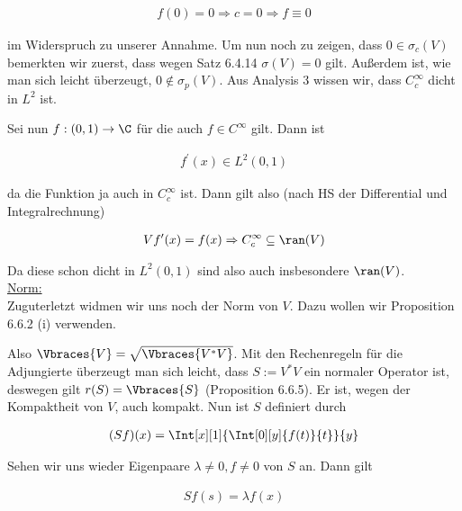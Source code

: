\begin{solution}
\begin{align*}
  f(0) = 0
  \Rightarrow
  c = 0
  \Rightarrow
  f \equiv 0
\end{align*}

im Widerspruch zu unserer Annahme. Um nun noch zu zeigen, dass $0 \in \sigma_c(V)$
bemerkten wir zuerst, dass wegen Satz 6.4.14 $\sigma(V) = {0}$ gilt. Außerdem ist,
wie man sich leicht überzeugt, $0 \notin \sigma_p(V)$. Aus Analysis 3 wissen wir, dass
$C_c^{\infty}$ dicht in $L^2$ ist.


Sei nun $f: (0,1) \rightarrow \C$ für die auch $ f \in C^{\infty}$ gilt. Dann ist

\begin{align*}
  f^\prime(x) \in L^2(0,1)
\end{align*}

da die Funktion ja auch in $C_c^{\infty}$ ist. Dann gilt also (nach HS der
Differential und Integralrechnung)

\begin{align*}
  Vf^\prime(x) = f(x)
  \Rightarrow
  C_c^{\infty} \subseteq \ran(V)
\end{align*}

Da diese schon dicht in $L^2(0,1)$ sind also auch insbesondere $\ran(V)$. \\

\underline{Norm:} \\

Zuguterletzt widmen wir uns noch der Norm von $V$. Dazu wollen wir Proposition
6.6.2 (i) verwenden.


Also $\Vbraces{V} = \sqrt{\Vbraces{V^*V}}$. Mit den Rechenregeln für die Adjungierte
überzeugt man sich leicht, dass $S:=V^*V$ ein normaler Operator ist, deswegen gilt
$r(S) = \Vbraces{S}$ (Proposition 6.6.5). Er ist, wegen der
Kompaktheit von $V$, auch kompakt. Nun ist $S$ definiert durch

\begin{align*}
  (Sf)(x)
  =
  \Int[x][1]{
    \Int[0][y]{f(t)}{t}
  }{y}
\end{align*}

Sehen wir uns wieder Eigenpaare $\lambda \neq 0, f \neq 0$ von $S$ an. Dann gilt

\begin{align*}
  Sf(s) = \lambda f(x)
\end{align*}


\end{solution}
